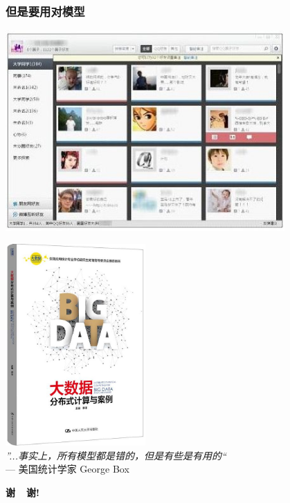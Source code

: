 \documentclass[11pt]{beamer}
\begin{document}
\begin{frame}
  \frametitle{但是要用对模型}

    \includegraphics[width=0.8\textwidth]{QQRecommend}


\end{frame}


\begin{frame}[plain]
  \addtocounter{framenumber}{-1}
\begin{multicols}{2}
  \includegraphics[width=0.4\textwidth]{bookcover-crop}\\
  \emph{”...事实上，所有模型都是错的，但是有些是有用的“}\\
  \hfill --- 美国统计学家 George Box
  \vspace{3cm}
  \begin{center}
    {\color{SUblue} \textbf{\Huge 谢~~谢!}}
  \end{center}
\end{multicols}

\end{frame}
\end{document}
